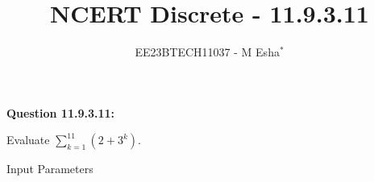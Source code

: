 \documentclass[journal,12pt,twocolumn]{IEEEtran}
\theoremstyle{remark}
\begin{document}

\vspace{3cm}

\title{NCERT Discrete - 11.9.3.11}
\author{EE23BTECH11037 - M Esha$^{*}$}

\maketitle
\newpage
\bigskip

\renewcommand{\thefigure}{\theenumi}
\renewcommand{\thetable}{\theenumi}

\vspace{3cm}
\textbf{Question 11.9.3.11:}

Evaluate $\sum_{k=1}^{11} (2 + 3^k)$.

\solution
\fi
\begin{table}[h!]
  \centering
  
  \caption{Input Parameters}
    \label{tab:eshatable1}
\end{table}\\
\end{document}
